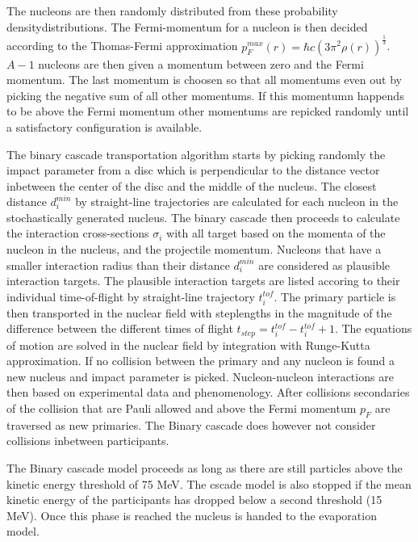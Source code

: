 The nucleons are then randomly distributed from these probability densitydistributions. The Fermi-momentum for a nucleon is then decided according to the Thomas-Fermi approximation $p^{max}_F(r) = \hbar c (3 \pi^2 \rho(r))^\frac{1}{3}$. $A-1$ nucleons are then given a momentum between zero and the Fermi momentum. The last momentum is choosen so that all momentums even out by picking the negative sum of all other momentums. If this momentumn happends to be above the Fermi momentum other momentums are repicked randomly until a satisfactory configuration is available.

The binary cascade transportation algorithm starts by picking randomly the impact parameter from a disc which is perpendicular to the distance vector inbetween the center of the disc and the middle of the nucleus. The closest distance $d^{min}_{i}$ by straight-line trajectories are calculated for each nucleon in the stochastically generated nucleus. The binary cascade then proceeds to calculate the interaction cross-sections $\sigma_i$ with all target based on the momenta of the nucleon in the nucleus, and the projectile momentum. Nucleons that have a smaller interaction radius than their distance $d^{min}_{i}$ are considered as plausible interaction targets. The plausible interaction targets are listed accoring to their individual time-of-flight by straight-line trajectory $t^{tof}_i$. The primary particle is then transported in the nuclear field with steplengths in the magnitude of the difference between the different times of flight $t_{step} = t^{tof}_i - t^{tof}_i+1$. The equations of motion are solved in the nuclear field by integration with Runge-Kutta approximation. If no collision between the primary and any nucleon is found a new nucleus and impact parameter is picked.
Nucleon-nucleon interactions are then based on experimental data and phenomenology. After collisions secondaries of the collision that are Pauli allowed and above the Fermi momentum $p_F$ are traversed as new primaries. The Binary cascade does however not consider collisions inbetween participants.

The Binary cascade model proceeds as long as there are still particles above the kinetic energy threshold  of 75 MeV. The cscade model is also stopped if the mean kinetic energy of the participants has dropped below a second threshold (15 MeV). Once this phase is reached the nucleus is handed to the evaporation model.

